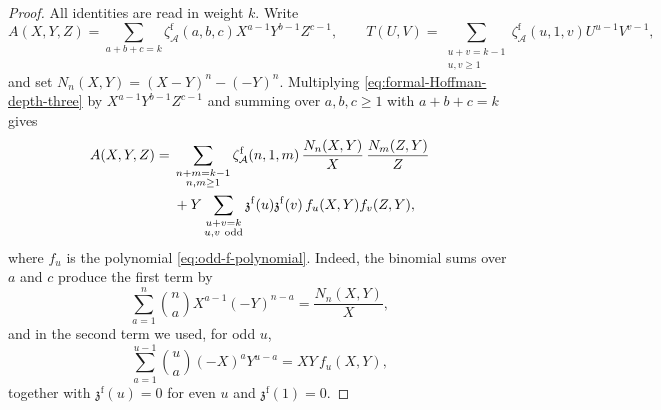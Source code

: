 \documentclass[12pt]{amsart}
\numberwithin{equation}{section}
\theoremstyle{plain}
\newcommand{\odd}{\mathrm{odd}}
\newcommand{\zaf}[1]{\zeta_{\mathcal A}^{\mathrm f}(#1)}
\newcommand{\zzf}[1]{\mathfrak z^{\mathrm f}(#1)}
\begin{document}
\begin{proof}
All identities are read in weight $k$. Write
\[
 A(X,Y,Z)=\sum_{a+b+c=k}\zaf{a,b,c}X^{a-1}Y^{b-1}Z^{c-1},
 \qquad
 T(U,V)=\sum_{\substack{u+v=k-1\\u,v\geq1}}\zaf{u,1,v}U^{u-1}V^{v-1},
\]
and set $N_n(X,Y)=(X-Y)^n-(-Y)^n$. Multiplying
\eqref{eq:formal-Hoffman-depth-three} by $X^{a-1}Y^{b-1}Z^{c-1}$ and
summing over $a,b,c\geq1$ with $a+b+c=k$ gives
\begin{align}\label{eq:hoffman-summed}
 A(X,Y,Z)={}&\sum_{\substack{n+m=k-1\\n,m\geq1}}\zaf{n,1,m}\,
 \frac{N_n(X,Y)}{X}\,\frac{N_m(Z,Y)}{Z}\notag\\
 &+Y\sum_{\substack{u+v=k\\u,v\ \odd}}
 \zzf u\zzf v\,f_u(X,Y)f_v(Z,Y),
\end{align}
where $f_u$ is the polynomial \eqref{eq:odd-f-polynomial}. Indeed,
the binomial sums over $a$ and $c$ produce the first term by
\[
 \sum_{a=1}^{n}\binom naX^{a-1}(-Y)^{n-a}=\frac{N_n(X,Y)}{X},
\]
and in the second term we used, for odd $u$,
\[
 \sum_{a=1}^{u-1}\binom ua(-X)^aY^{u-a}=XY\,f_u(X,Y),
\]
together with $\zzf u=0$ for even $u$ and $\zzf1=0$.


\end{proof}
\end{document}

